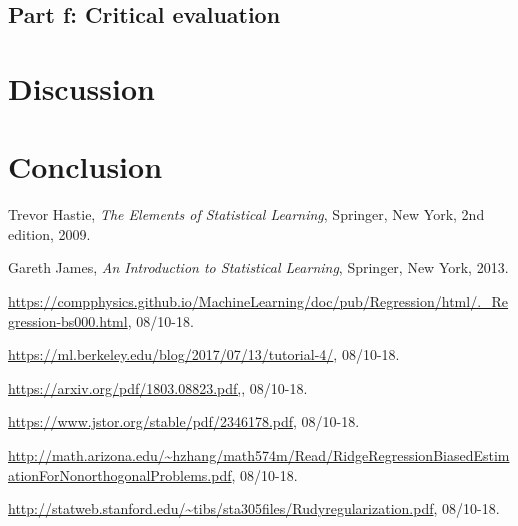 \documentclass[a4paper,12pt, english]{article}
\begin{document}
\subsection{Part f: Critical evaluation}

\section{Discussion}

\section{Conclusion}

\newpage

\begin{thebibliography}{9}

  Trevor Hastie,
  \textit{The Elements of Statistical Learning},
  Springer, New York,
  2nd edition,
  2009.

  Gareth James, 
  \textit{An Introduction to Statistical Learning},
  Springer, New York,
  2013.
  
  \url{https://compphysics.github.io/MachineLearning/doc/pub/Regression/html/._Regression-bs000.html}, 08/10-18.
  
  \url{https://ml.berkeley.edu/blog/2017/07/13/tutorial-4/}, 08/10-18.
  
  \url{https://arxiv.org/pdf/1803.08823.pdf,}, 08/10-18.
  
  \url{https://www.jstor.org/stable/pdf/2346178.pdf}, 08/10-18.
 
  \url{http://math.arizona.edu/~hzhang/math574m/Read/RidgeRegressionBiasedEstimationForNonorthogonalProblems.pdf}, 08/10-18.
  
  \url{http://statweb.stanford.edu/~tibs/sta305files/Rudyregularization.pdf}, 08/10-18.
  

\end{thebibliography}
\end{document}
